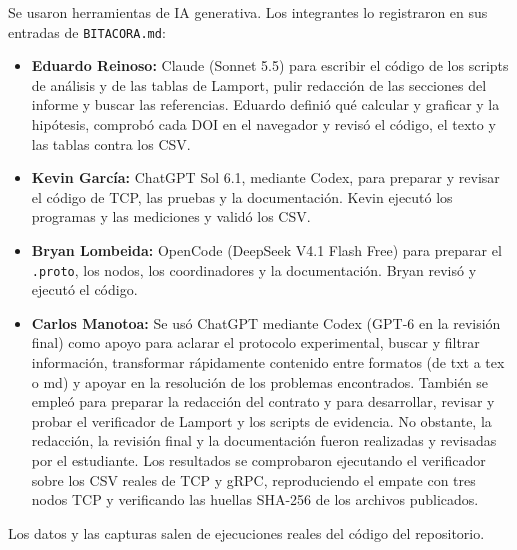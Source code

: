 \documentclass[11pt,a4paper]{article}
\begin{document}
Se usaron herramientas de IA generativa. Los integrantes lo registraron en sus entradas de
\texttt{BITACORA.md}:
\begin{itemize}
  \item \textbf{Eduardo Reinoso:} Claude (Sonnet 5.5) para escribir el código de los scripts
        de análisis y de las tablas de Lamport, pulir redacción de las secciones del informe
        y buscar las referencias. Eduardo definió qué calcular y graficar y la hipótesis,
        comprobó cada DOI en el navegador y revisó el código, el texto y las tablas contra los
        CSV.
  \item \textbf{Kevin García:} ChatGPT Sol 6.1, mediante Codex, para preparar y revisar el
        código de TCP, las pruebas y la documentación. Kevin ejecutó los programas y las
        mediciones y validó los CSV.
  \item \textbf{Bryan Lombeida:} OpenCode (DeepSeek V4.1 Flash Free) para preparar el
        \texttt{.proto}, los nodos, los coordinadores y la documentación. Bryan revisó y
        ejecutó el código.
  \item \textbf{Carlos Manotoa:} Se usó ChatGPT mediante Codex (GPT-6 en la revisión final) como apoyo para aclarar el protocolo experimental, buscar y filtrar información, transformar rápidamente contenido entre formatos (de txt a tex o md) y apoyar en la resolución de los problemas encontrados. También se empleó para preparar la redacción del contrato y para desarrollar, revisar y probar el verificador de Lamport y los scripts de evidencia. No obstante, la redacción, la revisión final y la documentación fueron realizadas y revisadas por el estudiante. Los resultados se comprobaron ejecutando el verificador sobre los CSV reales de TCP y gRPC, reproduciendo el empate con tres nodos TCP y verificando las huellas SHA-256 de los archivos publicados.
\end{itemize}
Los datos y las capturas salen de ejecuciones reales del código del repositorio.

\printbibliography
\end{document}
